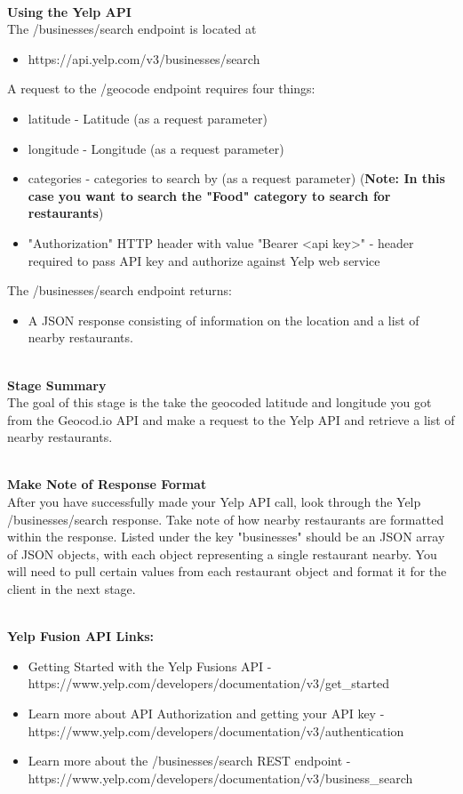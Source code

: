 \documentclass{article}
\begin{document}
\-\ \\
\textbf{Using the Yelp API} \\
The /businesses/search endpoint is located at
\begin{itemize}
\item https://api.yelp.com/v3/businesses/search
\end{itemize}
A request to the /geocode endpoint requires four things:
\begin{itemize}
\item latitude - Latitude (as a request parameter)
\item longitude - Longitude (as a request parameter)
\item categories - categories to search by (as a request parameter) (\textbf{Note: In this case you want to search the "Food" category to search for restaurants})
\item "Authorization" HTTP header with value "Bearer <api key>" - header required to pass API key and authorize against Yelp web service
\end{itemize}
The  /businesses/search endpoint returns:
\begin{itemize}
\item A JSON response consisting of information on the location and a list of nearby restaurants.
\end{itemize}

\-\ \\
\textbf{Stage Summary}\\
The goal of this stage is the take the geocoded latitude and longitude you got from the Geocod.io API and make a request to the Yelp API and retrieve a list of nearby restaurants.

\-\ \\
\textbf{Make Note of Response Format}\\
After you have successfully made your Yelp API call, look through the Yelp /businesses/search response. Take note of how nearby restaurants are formatted within the response. Listed under the key "businesses" should be an JSON array of JSON objects, with each object representing a single restaurant nearby. You will need to pull certain values from each restaurant object and format it for the client in the next stage. 

\-\ \\
\textbf{Yelp Fusion API Links:}
\begin{itemize}
\item Getting Started with the Yelp Fusions API - \\ \indent https://www.yelp.com/developers/documentation/v3/get\_started
\item  Learn more about API Authorization and getting your API key - \\ \indent https://www.yelp.com/developers/documentation/v3/authentication
\item Learn more about the /businesses/search REST endpoint - \\ \indent https://www.yelp.com/developers/documentation/v3/business\_search
\end{itemize}
\end{document}
